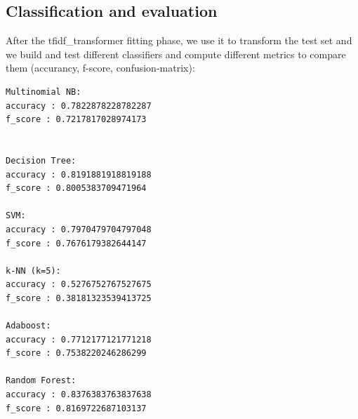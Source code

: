 \documentclass[a4paper]{article}
\begin{document}
\subsection{Classification and evaluation}
After the tfidf\_transformer fitting phase, we use it to transform the test set and we build and test different classifiers and compute different metrics to compare them (accurancy, f-score, confusion-matrix):
\begin{verbatim}
Multinomial NB:
accuracy : 0.7822878228782287
f_score : 0.7217817028974173


Decision Tree:
accuracy : 0.8191881918819188
f_score : 0.8005383709471964

SVM:
accuracy : 0.7970479704797048
f_score : 0.7676179382644147

k-NN (k=5):
accuracy : 0.5276752767527675
f_score : 0.38181323539413725

Adaboost:
accuracy : 0.7712177121771218
f_score : 0.7538220246286299

Random Forest:
accuracy : 0.8376383763837638
f_score : 0.8169722687103137
\end{verbatim}
\end{document}
